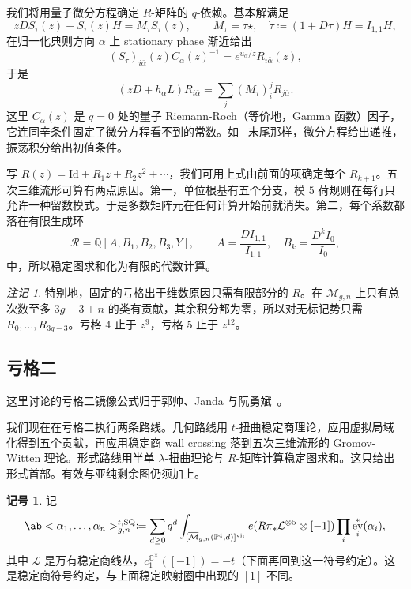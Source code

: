 \documentclass{amsart}
\theoremstyle{definition}
\newtheorem{notn}[thm]{记号}
\theoremstyle{remark}
\newtheorem{rmk}[thm]{注记}
\theoremstyle{plain}
\theoremstyle{definition}
\theoremstyle{remark}
\newcommand{\C}{\mathbb{C}}
\newcommand{\Q}{\mathbb{Q}}
\renewcommand{\P}{\mathbb{P}}
\newcommand{\Mbar}{\overline{\mathcal{M}}}
\newcommand{\mc}[1]{\mathcal{#1}}
\newcommand{\mr}[1]{\mathrm{#1}}
\newcommand{\1}{\mathbf{1}}
\newcommand{\2}{\mathbf{2}}
\newcommand{\3}{\mathbf{3}}
\newcommand{\vir}{\mr{vir}}
\DeclareMathOperator{\ev}{ev}
\begin{document}
我们将用量子微分方程确定 \(R\)-矩阵的 \(q\)-依赖。基本解满足
\[ zDS_{\tau}(z) + S_{\tau}(z)H = M_{\tau}S_{\tau}(z), \qquad M_{\tau} = \dot{\tau}\star, \quad \dot{\tau} \coloneqq (1+D\tau)H = I_{1,1}H, \]
在归一化典则方向 \(\alpha\) 上 stationary phase 渐近给出
\[ (S_{\tau})_{i\bar{\alpha}}(z)C_{\alpha}(z)^{-1} = e^{u_{\alpha}/z}R_{i\bar{\alpha}}(z), \]
于是
\[ (zD+h_{\alpha}L)R_{i\bar{\alpha}} = \sum_j (M_{\tau})_i^j R_{j\bar{\alpha}}. \]
这里 \(C_{\alpha}(z)\) 是 \(q=0\) 处的量子 Riemann-Roch（等价地，Gamma 函数）因子，它连同辛条件固定了微分方程看不到的常数。如~ 末尾那样，微分方程给出递推，振荡积分给出初值条件。

写 \(R(z) = \mr{Id} + R_1 z + R_2 z^2 + \cdots\)，我们可用上式由前面的项确定每个 \(R_{k+1}\)。五次三维流形可算有两点原因。第一，单位根基有五个分支，模 \(5\) 荷规则在每行只允许一种留数模式。于是多数矩阵元在任何计算开始前就消失。第二，每个系数都落在有限生成环
\[ \mc{R} = \Q[A,B_1,B_2,B_3,Y], \qquad A = \frac{DI_{1,1}}{I_{1,1}}, \quad B_k = \frac{D^k I_0}{I_0}, \]
中，所以稳定图求和化为有限的代数计算。

\begin{rmk}
    特别地，固定的亏格出于维数原因只需有限部分的 \(R\)。在 \(\Mbar_{g,n}\) 上只有总次数至多 \(3g-3+n\) 的类有贡献，其余积分都为零，所以对无标记势只需 \(R_0, \ldots, R_{3g-3}\)。亏格 \(4\) 止于 \(z^9\)，亏格 \(5\) 止于 \(z^{12}\)。
\end{rmk}

\subsection{亏格二}%
\label{sub:Genus two}

这里讨论的亏格二镜像公式归于郭帅、Janda 与阮勇斌~\cite{GJRgenus2}。

我们现在在亏格二执行两条路线。几何路线用 \(t\)-扭曲稳定商理论，应用虚拟局域化得到五个贡献，再应用稳定商 wall crossing 落到五次三维流形的 Gromov-Witten 理论。形式路线用半单 \(\lambda\)-扭曲理论与 \(R\)-矩阵计算稳定图求和。这只给出形式首部。有效与亚纯剩余图仍须加上。

\begin{notn}
    记
    \[ \ab<\alpha_1, \ldots, \alpha_n>^{t,\mr{SQ}}_{g,n} \coloneqq \sum_{d\geq0}q^d \int_{[\Mbar_{g,n}(\P^4,d)]^{\vir}}e(R\pi_*\mc{L}^{\otimes 5}\otimes[-1])\prod_i \ev_i^*(\alpha_i), \]
    其中 \(\mc{L}\) 是万有稳定商线丛，\(c_1^{\C^{\times}}([-1]) = -t\)（下面再回到这一符号约定）。这是稳定商符号约定，与上面稳定映射圈中出现的 \([1]\) 不同。
\end{notn}
\end{document}
